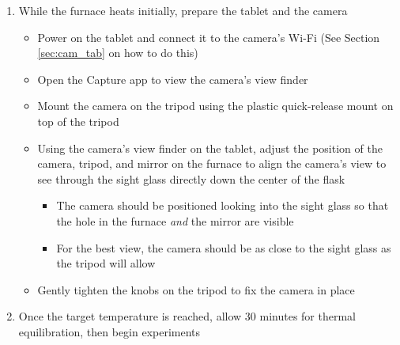 \documentclass[letterpaper,11pt]{article}
\begin{document}
\begin{enumerate}
    \item While the furnace heats initially, prepare the tablet and the camera
        \begin{itemize}
        \item Power on the tablet and connect it to the camera's Wi-Fi (See 
            Section \ref{sec:cam_tab} on how to do this)
        \item Open the Capture app to view the camera's view finder
        \item Mount the camera on the tripod using the plastic quick-release
            mount on top of the tripod
        \item Using the camera's view finder on the tablet, adjust the
            position of the camera, tripod, and mirror on the furnace to 
            align the camera's view to see through the sight glass directly down
            the center of the flask
            \begin{itemize}
            \item The camera should be positioned looking into the sight glass
                so that the hole in the furnace \textit{and} the mirror 
                are visible 
            \item For the best view, the camera should be as close to the 
                sight glass as the tripod will allow
            \end{itemize}
        
        \item Gently tighten the knobs on the tripod to fix the camera in place
        \end{itemize}
    
    \item Once the target temperature is reached, allow 30 minutes for thermal 
        equilibration, then begin experiments
    \end{enumerate}
    
\end{document}
